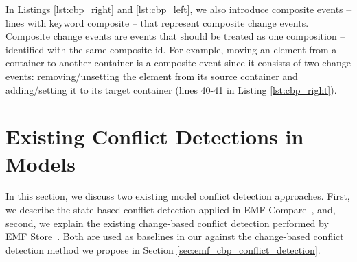 In Listings \ref{lst:cbp_right} and \ref{lst:cbp_left}, we also introduce composite events -- lines with keyword \textsf{composite} -- that represent composite change events. 
Composite change events are events that should be treated as one composition -- identified with the same composite id. 
For example, moving an element from a container to another container is a composite event since it consists of two change events: 
removing/unsetting the element from its source container and adding/setting it to its target container (lines 40-41 in Listing \ref{lst:cbp_right}).



\section{Existing Conflict Detections in Models}
\label{sec:existing_conflict_detections}

In this section, we discuss two existing model conflict detection approaches. First, we describe the state-based conflict detection applied in EMF Compare~\cite{emfcompare2018developer}, and, second, we explain the existing change-based conflict detection performed by EMF Store~\cite{emfstore2019what,koegel2010operation}. Both are used as baselines in our against the change-based conflict detection method we propose in Section \ref{sec:emf_cbp_conflict_detection}.

